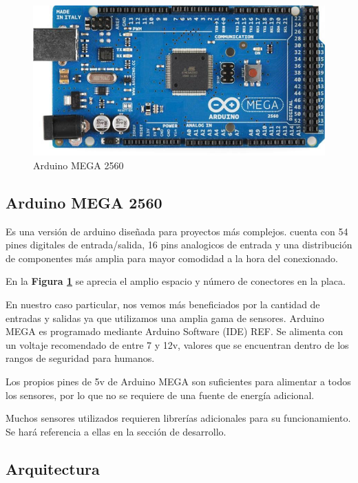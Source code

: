 \documentclass{IEEEtran}
\begin{document}
			\begin{figure}
				\centering
				\includegraphics[width=1\linewidth]{arduino-mega}
				\caption{Arduino MEGA 2560}
				\label{arduino-mega}
			\end{figure}

		\subsection{Arduino MEGA 2560}

			Es una versión de arduino diseñada para proyectos más complejos. cuenta con 54 pines digitales de entrada/salida, 16 pins analogicos de entrada y una distribución de componentes más amplia para mayor comodidad a la hora del conexionado.

			En la \textbf{Figura \ref{arduino-mega}} se aprecia el amplio espacio y número de conectores en la placa.

			En nuestro caso particular, nos vemos más beneficiados por la cantidad de entradas y salidas ya que utilizamos una amplia gama de sensores. Arduino MEGA es programado mediante Arduino Software (IDE) REF.  Se alimenta con un voltaje recomendado de entre 7 y 12v, valores que se encuentran dentro de los rangos de seguridad para humanos.

			Los propios pines de 5v de Arduino MEGA son suficientes para alimentar a todos los sensores, por lo que no se requiere de una fuente de energía adicional.

			Muchos sensores utilizados requieren librerías adicionales para su funcionamiento. Se hará referencia a ellas en la sección de desarrollo.

		\subsection{Arquitectura}
\end{document}
